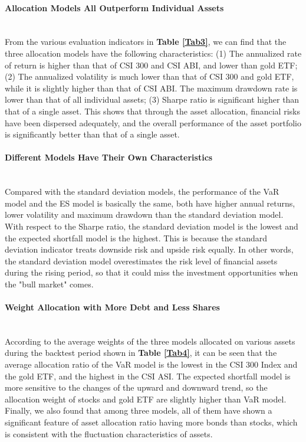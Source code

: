 \paragraph{Allocation Models All Outperform Individual Assets}\mbox{}\\
From the various evaluation indicators in \textbf{Table \ref{Tab3}}, we can find that the three allocation models have the following characteristics: (1) The annualized rate of return is higher than that of CSI 300 and CSI ABI, and lower than gold ETF; (2) The annualized volatility is much lower than that of CSI 300 and gold ETF, while it is slightly higher than that of CSI ABI. The maximum drawdown rate is lower than that of all individual assets; (3) Sharpe ratio is significant higher than that of a single asset.
This shows that through the asset allocation, financial risks have been dispersed adequately, and the overall performance of the asset portfolio is significantly better than that of a single asset.

\paragraph{Different Models Have Their Own Characteristics}\mbox{}\\
Compared with the standard deviation models, the performance of the VaR model and the ES model is basically the same, both have higher annual returns, lower volatility and maximum drawdown than the standard deviation model. With respect to the Sharpe ratio, the standard deviation model is the lowest and the expected shortfall model is the highest. This is because the standard deviation indicator treats downside risk and upside risk equally. In other words, the standard deviation model overestimates the risk level of financial assets during the rising period, so that it could miss the investment opportunities when the "bull market" comes. 


\paragraph{Weight Allocation with More Debt and Less Shares}\mbox{}\\
According to the average weights of the three models allocated on various assets during the backtest period shown in \textbf{Table \ref{Tab4}}, it can be seen that the average allocation ratio of the VaR model is the lowest in the CSI 300 Index and the gold ETF, and the highest in the CSI ASI. The expected shortfall model is more sensitive to the changes of the upward and downward trend, so the allocation weight of stocks and gold ETF are slightly higher than VaR model. Finally, we also found that among three models, all of them have shown a significant feature of asset allocation ratio having more bonds than stocks, which is consistent with the fluctuation characteristics of assets.
